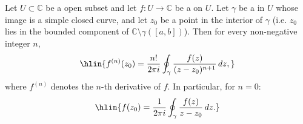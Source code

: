 \begin{theorem} \label{theorem:cauchy_integral_formula_for_holomorphic_functions_expressing_values_and_derivatives_via_contour_integrals}
    Let $U \subset \mathbb{C}$ be a  open subset and let $f : U \to \mathbb{C}$ be a  on $U$. Let $\gamma$ be a   in $U$ whose image is a simple closed curve, and let $z_0$ be a point in the interior of $\gamma$ (i.e. $z_0$ lies in the bounded component of $\mathbb{C} \setminus \gamma([a,b])$). Then for every non-negative integer $n$,
    $$\hlin{f^{(n)}(z_0) = \frac{n!}{2\pi i} \oint_{\gamma} \frac{f(z)}{(z - z_0)^{n+1}}\,dz,}$$
    where $f^{(n)}$ denotes the $n$-th derivative of $f$. In particular, for $n = 0$:
    $$\hlin{f(z_0) = \frac{1}{2\pi i} \oint_{\gamma} \frac{f(z)}{z - z_0}\,dz.}$$
\end{theorem}

